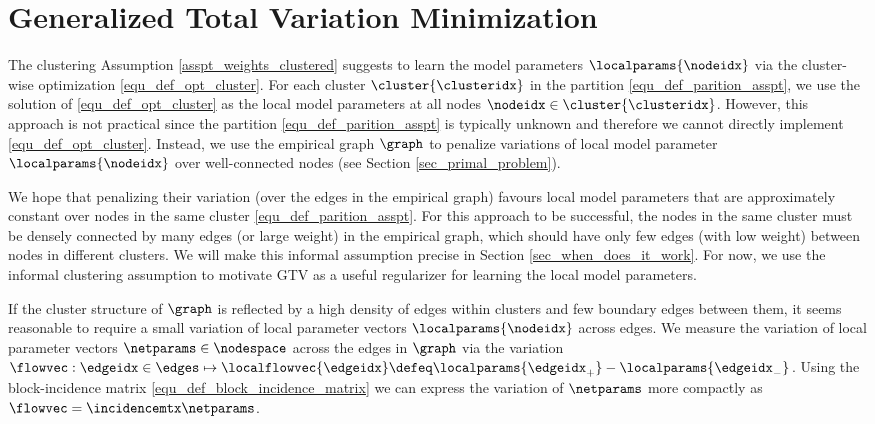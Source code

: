 \documentclass[lettersize,journal]{IEEEtran}
\begin{document}
\section{Generalized Total Variation Minimization}
\label{sec_nLasso}

The clustering Assumption \ref{asspt_weights_clustered} suggests to learn the model parameters $\localparams{\nodeidx}$ via 
the cluster-wise optimization \eqref{equ_def_opt_cluster}. For each cluster $\cluster{\clusteridx}$ in the partition \eqref{equ_def_parition_asspt}, 
we use the solution of \eqref{equ_def_opt_cluster} as the local model parameters at all nodes $\nodeidx \in \cluster{\clusteridx}$. 
However, this approach is not practical since the partition \eqref{equ_def_parition_asspt} is typically unknown and therefore 
we cannot directly implement \eqref{equ_def_opt_cluster}. Instead, we use the empirical graph $\graph$ to penalize variations 
of local model parameter $\localparams{\nodeidx}$ over well-connected nodes (see Section \ref{sec_primal_problem}). 

We hope that penalizing their variation (over the edges in the empirical graph) favours local model parameters 
that are approximately constant over nodes in the same cluster \eqref{equ_def_parition_asspt}. For this approach 
to be successful, the nodes in the same cluster must be densely connected by many edges (or large weight) in 
the empirical graph, which should have only few edges (with low weight) between nodes in different clusters. 
We will make this informal assumption precise in Section \ref{sec_when_does_it_work}. For now, we use the 
informal clustering assumption to motivate GTV as a useful regularizer for learning the local model parameters. 

If the cluster structure of $\graph$ is reflected by a high density of edges within clusters and  
few boundary edges between them, it seems reasonable to require a small variation of local 
parameter vectors $\localparams{\nodeidx}$ across edges. We measure the variation of local parameter 
vectors $\netparams \in \nodespace$ across the edges in $\graph$ via the variation $\flowvec: \edgeidx \in \edges \mapsto \localflowvec{\edgeidx} \defeq \localparams{\edgeidx_{+}} -  \localparams{\edgeidx_{-}}$. 
Using the block-incidence matrix \eqref{equ_def_block_incidence_matrix} we can express the variation of $\netparams$
more compactly as $\flowvec = \incidencemtx \netparams$. 
\end{document}
